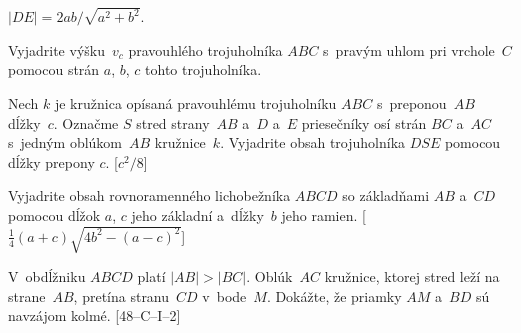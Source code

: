 {\odpoved
$|DE|=2ab/\sqrt{a^2+b^2}$.

Vyjadrite výšku~$v_c$ pravouhlého trojuholníka $ABC$ s~pravým uhlom pri vrchole~$C$ pomocou strán $a$, $b$, $c$ tohto trojuholníka.

\D
Nech $k$ je kružnica opísaná pravouhlému trojuholníku $ABC$ s~preponou~$AB$ dĺžky~$c$. Označme $S$ stred strany~$AB$ a~$D$ a~$E$ priesečníky osí strán $BC$ a~$AC$ s~jedným oblúkom~$AB$ kružnice~$k$. Vyjadrite obsah trojuholníka $DSE$ pomocou dĺžky prepony $c$. [$c^2/8$]

Vyjadrite obsah rovnoramenného lichobežníka $ABCD$ so základňami $AB$ a~$CD$ pomocou dĺžok $a$, $c$ jeho základní a~dĺžky~$b$ jeho ramien. [$\frac14(a+c)\sqrt{4b^2-(a-c)^2}$]

V~obdĺžniku $ABCD$ platí $|AB|>|BC|$. Oblúk~$AC$ kružnice, ktorej stred leží na strane~$AB$, pretína stranu~$CD$ v~bode~$M$. Dokážte, že priamky $AM$ a~$BD$ sú navzájom kolmé. [48--C--I--2]
}

